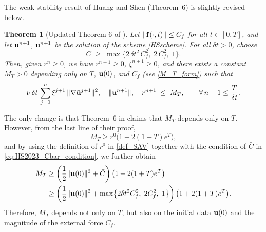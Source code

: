 \documentclass{article}
\newtheorem{theorem}{Theorem}[section]      %
\theoremstyle{definition}                   %
\begin{document}
The weak stability result of Huang and Shen
\cite{HuangShen2023} (Theorem~6) is slightly revised below. 
\begin{theorem}[Updated Theorem 6 of \cite{HuangShen2023}]
\label{thm:HS2023_Thm6}
Let $\|{\bf f}(\cdot,t)\| \le C_f$ for all $t \in [0,T]$, and let
$\bar{\bf u}^{n+1}$, ${\bf u}^{n+1}$ be the solution of the scheme
\eqref{HSscheme}. For all $\delta t > 0$, choose
\begin{equation}
\bar C \;\ge\; \max\bigl\{ 2\,\delta t^{2}\, C_f^{2},\; 2\,C_f^{2},\; 1\bigr\}.
\label{eq:HS2023_Cbar_condition}
\end{equation}
Then, given $r^{n} \ge 0$, we have $r^{n+1} \ge 0$,
$\xi^{n+1} \ge 0$, and there exists a constant $M_T > 0$ depending only on $T$, ${\bf u}(0)$, and $C_f$ (see \eqref{M_T_form}) such that
\begin{equation}
\nu\, \delta t\, \sum_{j=0}^{n} \xi^{j+1}\,\|\nabla \bar{\bf u}^{j+1}\|^{2},
\quad
\|{\bf u}^{n+1}\|,
\quad
r^{n+1}
\;\le\; M_T,
\qquad \forall\, n+1 \le \frac{T}{\delta t}.
\label{eq:HS2023_Thm6_bound}
\end{equation}
\end{theorem}
The only change is that Theorem~6 in \cite{HuangShen2023} claims that $M_T$ depends only on $T$. However, from the last line of their proof,
\[
M_T \ge r^0 \bigl(1+ 2(1+T)e^T \bigr),
\]
and by using the definition of $r^0$ in \eqref{def_SAV} together with the condition of $\bar{C}$ in \eqref{eq:HS2023_Cbar_condition}, we further obtain
\begin{align}
M_T 
&\ge 
\left(\frac{1}{2}\|{\bf u}(0)\|^2 + \bar{C}\right)
\bigl(1+ 2(1+T)e^T \bigr)\notag \\
&\ge 
\left(
\frac{1}{2}\|{\bf u}(0)\|^2 
+ \max\bigl\{2\delta t^{2} C_f^{2},\; 2C_f^{2},\; 1\bigr\}
\right)
\bigl(1+ 2(1+T)e^T \bigr).
\label{M_T_form}
\end{align}
Therefore, $M_T$ depends not only on $T$, but also on the initial data ${\bf u}(0)$ and the magnitude of the external force $C_f$.
\end{document}

